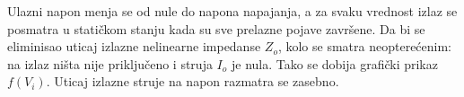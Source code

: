 Ulazni napon menja se od nule do napona napajanja, a za svaku vrednost izlaz se posmatra u statičkom stanju kada su sve prelazne pojave završene. Da bi se eliminisao uticaj izlazne nelinearne impedanse $Z_o$, kolo se smatra neopterećenim: na izlaz ništa nije priključeno i struja $I_o$ je nula. Tako se dobija grafički prikaz $f(V_i)$. Uticaj izlazne struje na napon razmatra se zasebno.
